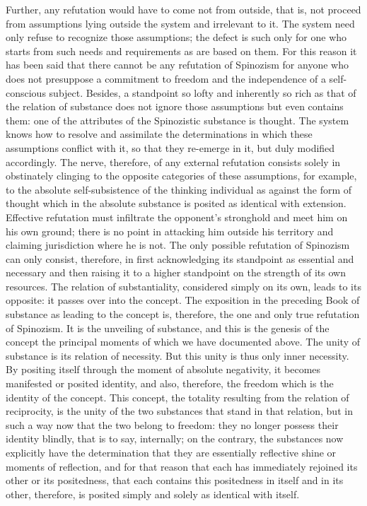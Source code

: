 Further, any refutation would have to come not from outside,
that is, not proceed from assumptions lying outside
the system and irrelevant to it.
The system need only refuse to recognize those assumptions;
the defect is such only for one who starts from such
needs and requirements as are based on them.
For this reason it has been said that there cannot be
any refutation of Spinozism for anyone
who does not presuppose a commitment to freedom
and the independence of a self-conscious subject.
Besides, a standpoint so lofty and inherently so rich as
that of the relation of substance does not ignore
those assumptions but even contains them:
one of the attributes of the Spinozistic substance is thought.
The system knows how to resolve and assimilate the
determinations in which these assumptions conflict with it,
so that they re-emerge in it, but duly modified accordingly.
The nerve, therefore, of any external refutation
consists solely in obstinately clinging
to the opposite categories of these assumptions,
for example, to the absolute self-subsistence of
the thinking individual as against the form of thought
which in the absolute substance is
posited as identical with extension.
Effective refutation must infiltrate the opponent's stronghold
and meet him on his own ground;
there is no point in attacking him outside his territory
and claiming jurisdiction where he is not.
The only possible refutation of Spinozism
can only consist, therefore, in first acknowledging
its standpoint as essential and necessary
and then raising it to a higher standpoint
on the strength of its own resources.
The relation of substantiality,
considered simply on its own,
leads to its opposite:
it passes over into the concept.
The exposition in the preceding Book
of substance as leading to the concept is, therefore,
the one and only true refutation of Spinozism.
It is the unveiling of substance,
and this is the genesis of the concept
the principal moments of which we have documented above.
The unity of substance is its relation of necessity.
But this unity is thus only inner necessity.
By positing itself through the moment of absolute negativity,
it becomes manifested or posited identity,
and also, therefore, the freedom which is the identity
of the concept.
This concept, the totality resulting from
the relation of reciprocity,
is the unity of the two substances
that stand in that relation,
but in such a way now that the two belong to freedom:
they no longer possess their identity blindly,
that is to say, internally;
on the contrary, the substances now explicitly have
the determination that they are essentially
reflective shine or moments of reflection,
and for that reason that each has immediately
rejoined its other or its positedness,
that each contains this
positedness in itself and in its other,
therefore, is posited simply and solely
as identical with itself.

